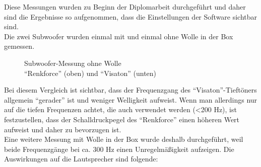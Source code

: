 \newpage
Diese Messungen wurden zu Beginn der Diplomarbeit durchgeführt und daher sind die Ergebnisse so aufgenommen, dass die Einstellungen der Software sichtbar sind.\\
Die zwei Subwoofer wurden einmal mit und einmal ohne Wolle in der Box gemessen. 
\begin{figure} [H]
	\centering
	\quad
	\caption{Subwoofer-Messung ohne Wolle\\ \enquote{Renkforce} (oben) und \enquote{Visaton} (unten)}
	\label{fig:5.3.3.2}
\end{figure}
Bei diesem Vergleich ist sichtbar, dass der Frequenzgang des \enquote{Visaton}-Tieftöners allgemein \enquote{gerader} ist und weniger Welligkeit aufweist. Wenn man allerdings nur auf die tiefen Frequenzen achtet, die auch verwendet werden (<200 Hz), ist festzustellen, dass der Schalldruckpegel des \enquote{Renkforce} einen höheren Wert aufweist und daher zu bevorzugen ist.\\
Eine weitere Messung mit Wolle in der Box wurde deshalb durchgeführt, weil beide Frequenzgänge bei ca. 300 Hz einen Unregelmäßigkeit aufzeigen. Die Auswirkungen auf die Lautsprecher sind folgende:
